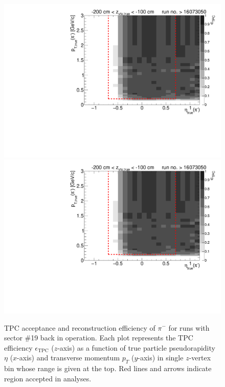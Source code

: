 \begin{figure}[hb]
	\caption[TPC acceptance and reconstruction efficiency of $\pi^{-}$ for runs with  sector \#19 back in operation.]{TPC acceptance and reconstruction efficiency of $\pi^{-}$ for runs with  sector \#19 back in operation. Each plot represents the TPC efficiency $\epsilon_{\text{TPC}}$ ($z$-axis) as a function of true particle pseudorapidity $\eta$ ($x$-axis) and transverse momentum $p_{T}$ ($y$-axis) in single $z$-vertex bin whose range is given at the top. Red lines and arrows indicate region accepted in analyses.}\label{fig:tpcEff_pion_minus1}
	\centering
	\parbox{0.495\textwidth}{
		\centering
		\includegraphics[width=\linewidth,page=3]{graphics/eff/Eff2D_TPC_pion_Minus_RunRange2.pdf}\\
		\includegraphics[width=\linewidth,page=5]{graphics/eff/Eff2D_TPC_pion_Minus_RunRange2.pdf}\\
}
\end{figure}
